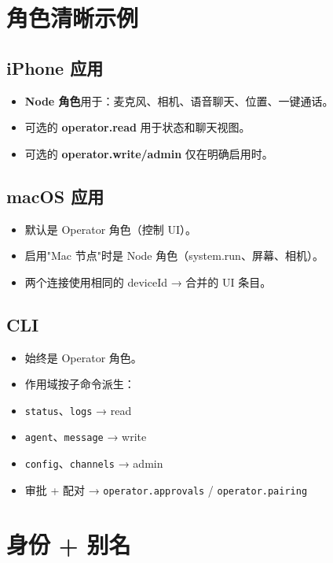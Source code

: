 \hrulefill


\section{角色清晰示例}


\subsection{iPhone 应用}


\begin{itemize}
  \item \textbf{Node 角色}用于：麦克风、相机、语音聊天、位置、一键通话。
  \item 可选的 \textbf{operator.read} 用于状态和聊天视图。
  \item 可选的 \textbf{operator.write/admin} 仅在明确启用时。
\end{itemize}


\subsection{macOS 应用}


\begin{itemize}
  \item 默认是 Operator 角色（控制 UI）。
  \item 启用"Mac 节点"时是 Node 角色（system.run、屏幕、相机）。
  \item 两个连接使用相同的 deviceId → 合并的 UI 条目。
\end{itemize}


\subsection{CLI}


\begin{itemize}
  \item 始终是 Operator 角色。
  \item 作用域按子命令派生：
  \item \texttt{status}、\texttt{logs} → read
  \item \texttt{agent}、\texttt{message} → write
  \item \texttt{config}、\texttt{channels} → admin
  \item 审批 + 配对 → \texttt{operator.approvals} / \texttt{operator.pairing}
\end{itemize}


\hrulefill


\section{身份 + 别名}


